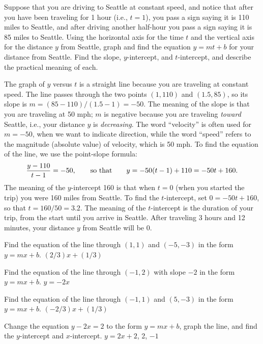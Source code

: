 \example Suppose that you are driving to Seattle at constant speed, and
notice that after you have been traveling for 1 hour (i.e., $t=1$),
you pass a sign saying it is 110 miles to Seattle, and after driving
another half-hour you pass a sign saying it is 85 miles to Seattle.  Using
the horizontal axis for the time $t$ and the vertical axis for the
distance $y$ from Seattle, graph and find the equation $y=mt+b$ for
your distance from Seattle.  Find the slope, $y$-intercept, and
$t$-intercept, and describe the practical meaning of each.

The graph of $y$ versus $t$ is a straight line because you are traveling
at constant speed.  The line passes through the two points $(1,110)$ and
$(1.5,85)$, so its slope is $m=(85-110)/(1.5-1)=-50$.  The meaning of the
slope is that you are traveling at 50 mph; $m$ is negative because you are
traveling {\em toward\/} Seattle, i.e., your distance $y$ is {\em
decreasing}.  The word ``velocity'' is often used for $m=-50$, when we want
to indicate direction, while the word ``speed'' refers to the magnitude
(absolute value) of velocity, which is 50 mph.  To find the equation of the
line, we use the point-slope formula:
$$
    {y-110\over t-1}=-50,\qquad\hbox{so~that}\qquad y=-50(t-1)+110=-50t+160.
$$ 
The meaning of the $y$-intercept 160 is that when $t=0$ (when you
started the trip) you were 160 miles from Seattle.  To find the
$t$-intercept, set $0=-50t+160$, so that $t=160/50=3.2$.  The meaning
of the $t$-intercept is the duration of your trip, from the start
until you arrive in Seattle.
After traveling 3 hours and 12 minutes, your distance $y$ from Seattle will be
0.  
\endexample 

\exercises

\exercise Find the equation of the line through $(1,1)$ and $(-5, -3)$ in
the form $y=mx+b$.
\answer $(2/3)x+(1/3)$
\endanswer
\endexercise

\exercise Find the equation of the line through $(-1,2)$ with slope $-2$ in
the form $y=mx+b$.
\answer $y=-2x$
\endanswer
\endexercise

\exercise Find the equation of the line through $(-1,1)$ and $(5, -3)$ in
the form $y=mx+b$.
\answer $(-2/3)x+(1/3)$
\endanswer

\endexercise

\exercise Change the equation $y-2x=2$ to the form $y=mx+b$, graph the
line, and find the $y$-intercept and $x$-intercept.
\answer $y=2x+2$, 2, $-1$
\endanswer
\endexercise

